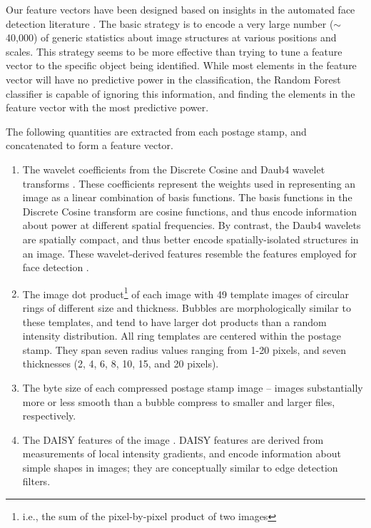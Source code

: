 \documentclass[preprint]{aastex}
\begin{document}
Our feature vectors have been designed based on insights in the automated face detection literature \citep{ViolaJones}.  The basic strategy is to encode a very large number ($\sim$40,000) of generic statistics about image structures at various positions and scales. This strategy seems to be more effective than trying to tune a feature vector to the specific object being identified. While most elements in the feature vector will have no predictive power in the classification, the Random Forest classifier is capable of ignoring this information, and finding the elements in the feature vector with the most predictive power.

The following quantities are extracted from each postage stamp, and concatenated to form a feature vector.

\begin{enumerate}
\item The wavelet coefficients from the Discrete Cosine and Daub4 wavelet transforms \citep{Press07}. These coefficients represent the weights used in representing an image as a linear combination of basis functions. The basis functions in the Discrete Cosine transform are cosine functions, and thus encode information about power at different spatial frequencies. By contrast, the Daub4 wavelets are spatially compact, and thus better encode spatially-isolated structures in an image. These wavelet-derived features resemble the features employed for face detection \citep{ViolaJones}.
\item The image dot product\footnote{i.e., the sum of the pixel-by-pixel product of two images} of each image with 49 template images of circular rings of different size and thickness. Bubbles are morphologically similar to these templates, and tend to have larger dot products than a random intensity distribution. All ring templates are centered within the postage stamp. They span seven radius values ranging from 1-20 pixels, and seven thicknesses (2, 4, 6, 8, 10, 15, and 20 pixels).
\item The byte size of each compressed postage stamp image -- images substantially more or less smooth than a bubble compress to smaller and larger files, respectively.
\item The DAISY features of the image \citep{DAISY}. DAISY features are derived from measurements of local intensity gradients, and encode information about simple shapes in images; they are conceptually similar to edge detection filters.
\end{enumerate}
\end{document}
